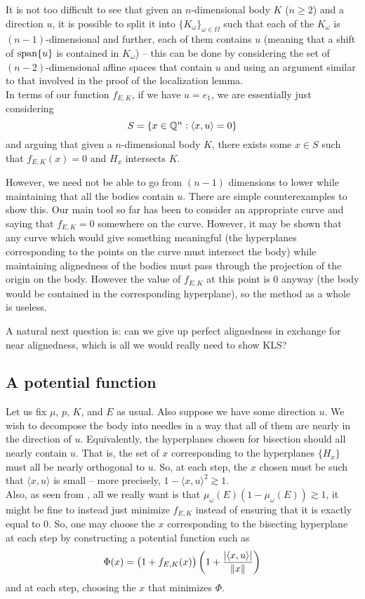 \documentclass{article}
\begin{document}
		It is not too difficult to see that given an $n$-dimensional body $K$ ($n \geq 2$) and a direction $u$, it is possible to split it into $\{K_\omega\}_{\omega \in \Omega}$ such that each of the $K_\omega$ is $(n-1)$-dimensional and further, each of them contains $u$ (meaning that a shift of $\operatorname{span}\{u\}$ is contained in $K_\omega$) -- this can be done by considering the set of $(n-2)$-dimensional affine spaces that contain $u$ and using an argument similar to that involved in the proof of the localization lemma.\\
		In terms of our function $f_{E,K}$, if we have $u = e_1$, we are essentially just considering
		\[ S = \{ x \in \mathbb{Q}^n : \langle x , u \rangle = 0 \} \]
		and arguing that given a $n$-dimensional body $K$, there exists some $x \in S$ such that $f_{E,K}(x) = 0$ and $H_x$ intersects $K$.

		However, we need not be able to go from $(n-1)$ dimensions to lower while maintaining that all the bodies contain $u$. There are simple counterexamples to show this. Our main tool so far has been to consider an appropriate curve and saying that $f_{E,K} = 0$ somewhere on the curve. However, it may be shown that any curve which would give something meaningful (the hyperplanes corresponding to the points on the curve must intersect the body) while maintaining alignedness of the bodies must pass through the projection of the origin on the body. However the value of $f_{E,K}$ at this point is $0$ anyway (the body would be contained in the corresponding hyperplane), so the method as a whole is useless.

		A natural next question is: can we give up perfect alignedness in exchange for near alignedness, which is all we would really need to show KLS?

	\subsection{A potential function}

		Let us fix $\mu$, $p$, $K$, and $E$ as usual. Also suppose we have some direction $u$. We wish to decompose the body into needles in a way that all of them are nearly in the direction of $u$. Equivalently, the hyperplanes chosen for bisection should all nearly contain $u$. That is, the set of $x$ corresponding to the hyperplanes $\{H_x\}$ must all be nearly orthogonal to $u$. So, at each step, the $x$ chosen must be such that $\langle x , u \rangle$ is small -- more precisely, $1 - \langle x , u \rangle^2 \gtrsim 1$.\\
		Also, as seen from , all we really want is that $\mu_\omega(E)(1-\mu_\omega(E)) \gtrsim 1$, it might be fine to instead just minimize $f_{E,K}$ instead of ensuring that it is exactly equal to $0$. So, one may choose the $x$ corresponding to the bisecting hyperplane at each step by constructing a potential function such as
		\[ \Phi(x) = \left(1 + f_{E,K}(x)\right) \left(1 + \frac{|\langle x , u \rangle|}{\left\lVert x\right\rVert}\right) \]
		and at each step, choosing the $x$ that minimizes $\Phi$.



\end{document}
